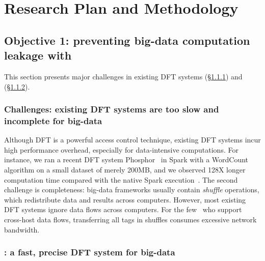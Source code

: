 \vspace{-.15in}\section{Research Plan and Methodology}
\label{sec:plan}

% 

\vspace{-.15in}\subsection{Objective 1: 
preventing big-data computation leakage with \kakute}\label{sec:obj1}
\vspace{-.075in}
This section presents major challenges in existing DFT systems 
(\S\ref{sec:ift-problem}) and \kakute (\S\ref{sec:kakute}).

\vspace{-.15in}
\subsubsection{Challenges: existing DFT systems are too slow and incomplete for 
big-data} 
\label{sec:ift-problem}\vspace{-.075in}

Although DFT is a powerful access control technique, existing DFT systems incur 
high performance overhead, especially for data-intensive computations. For 
instance, we ran a recent DFT system Phosphor~\cite{oo14:phosphor} in Spark 
with a WordCount algorithm on a small dataset of merely 200MB, and we observed 
128X longer computation time compared with the native Spark 
execution~\cite{kakute:acsac17}. The second challenge is completeness: 
big-data frameworks usually contain \emph{shuffle} operations, which 
redistribute data and results across computers. However, most existing DFT 
systems ignore data flows across computers. For the 
few~\cite{cloudfence:raid13} who support cross-host data flows, transferring 
all tags in shuffles consumes excessive network bandwidth.

\vspace{-.15in}\subsubsection{\kakute: a fast, precise DFT system for big-data} 
\label{sec:kakute}\vspace{-.075in}

